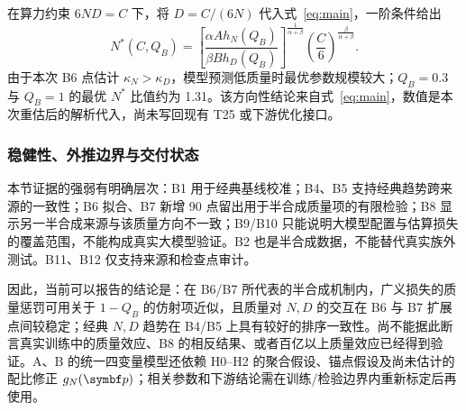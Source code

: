 在算力约束 $6ND=C$ 下，将 $D=C/(6N)$ 代入式~\eqref{eq:main}，一阶条件给出
\begin{equation}
N^*(C,Q_B)=
\left[\frac{\alpha A h_N(Q_B)}{\beta B h_D(Q_B)}\right]^{\frac{1}{\alpha+\beta}}
\left(\frac{C}{6}\right)^{\frac{\beta}{\alpha+\beta}}.
\label{eq:nstar}
\end{equation}
由于本次 B6 点估计 $\kappa_N>\kappa_D$，模型预测低质量时最优参数规模较大；$Q_B=0.3$ 与 $Q_B=1$ 的最优 $N^*$ 比值约为 1.31。该方向性结论来自式~\eqref{eq:main}，数值是本次重估后的解析代入，尚未写回现有 T25 或下游优化接口。

\subsubsection{稳健性、外推边界与交付状态}

本节证据的强弱有明确层次：B1 用于经典基线校准；B4、B5 支持经典趋势跨来源的一致性；B6 拟合、B7 新增 90 点留出用于半合成质量项的有限检验；B8 显示另一半合成来源与该质量方向不一致；B9/B10 只能说明大模型配置与估算损失的覆盖范围，不能构成真实大模型验证。B2 也是半合成数据，不能替代真实族外测试。B11、B12 仅支持来源和检查点审计。

因此，当前可以报告的结论是：在 B6/B7 所代表的半合成机制内，广义损失的质量惩罚可用关于 $1-Q_B$ 的仿射项近似，且质量对 $N,D$ 的交互在 B6 与 B7 扩展点间较稳定；经典 $N,D$ 趋势在 B4/B5 上具有较好的排序一致性。尚不能据此断言真实训练中的质量效应、B8 的相反结果、或者百亿以上质量效应已经得到验证。A、B 的统一四变量模型还依赖 H0--H2 的聚合假设、锚点假设及尚未估计的配比修正 $g_N(\bp)$；相关参数和下游结论需在训练/检验边界内重新标定后再使用。
